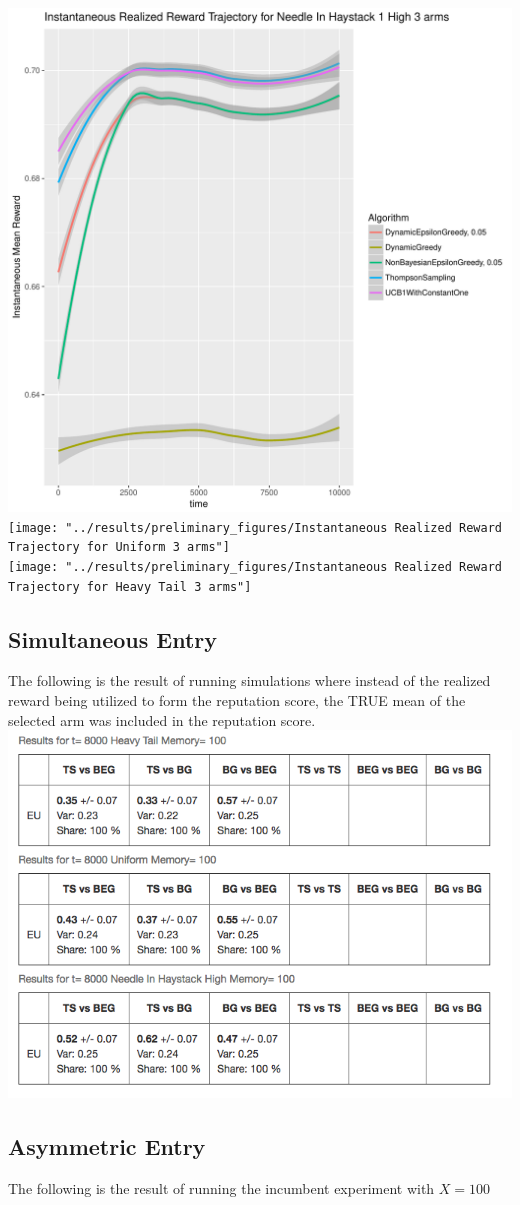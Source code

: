 \documentclass[11pt,letterpaper]{article}
\begin{document}
\includegraphics[scale=0.5]{"../results/preliminary_figures/Instantaneous Realized Reward Trajectory for Needle In Haystack 1 High 3 arms"} \\
\texttt{[image: "../results/preliminary\_figures/Instantaneous Realized Reward Trajectory for Uniform 3 arms"]} \\
\texttt{[image: "../results/preliminary\_figures/Instantaneous Realized Reward Trajectory for Heavy Tail 3 arms"]}

\subsection*{Simultaneous Entry}

The following is the result of running simulations where instead of the realized reward being utilized to form the reputation score, the TRUE mean of the selected arm was included in the reputation score.\\
\includegraphics[scale=0.5]{"reputation_true_mean"}

\subsection*{Asymmetric Entry}

The following is the result of running the incumbent experiment with $X = 100$


\end{document}
